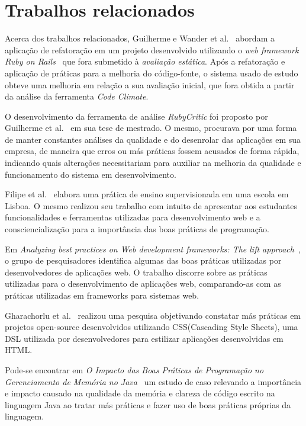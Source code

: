 \documentclass[11pt,a4paper,usenames,dvipsnames]{article}
\begin{document}
\section{Trabalhos relacionados}\label{sec:RelatedWork}

Acerca dos trabalhos relacionados, Guilherme e Wander et al.~\cite{Climate} abordam a aplicação de refatoração em um projeto desenvolvido utilizando o \textit{web framework Ruby on Rails}~\cite{RoR} que fora submetido à \textit{avaliação estática}. Após a refatoração e aplicação de práticas para a melhoria do código-fonte, o sistema usado de estudo obteve uma melhoria em relação a sua avaliação inicial, que fora obtida a partir da análise da ferramenta \textit{Code Climate}\cite{CodeClimate}. 

O desenvolvimento da ferramenta de análise \textit{RubyCritic} foi proposto por Guilherme et al.~\cite{RC} em sua tese de mestrado. O mesmo, procurava por uma forma de manter constantes análises da qualidade e do desenrolar das aplicações em sua empresa, de maneira que erros ou más práticas fossem acusados de forma rápida, indicando quais alterações necessitariam para auxiliar na melhoria da qualidade e funcionamento do sistema em desenvolvimento.

Filipe et al.~\cite{gil2014desenvolvimento} elabora uma prática de ensino supervisionada em uma escola em Lisboa. O mesmo realizou seu trabalho com intuito de apresentar aos estudantes funcionalidades e ferramentas utilizadas para desenvolvimento web e a consciencialização para a importância das boas práticas de programação.

Em \textit{Analyzing best practices on Web development frameworks: The lift approach}~\cite{del2015analyzing}, o grupo de pesquisadores identifica algumas das boas práticas utilizadas por desenvolvedores de aplicações web. O trabalho discorre sobre as práticas utilizadas para o desenvolvimento de aplicações web, comparando-as com as práticas utilizadas em frameworks para sistemas web.

 Gharachorlu et al.~\cite{gharachorlu2014code} realizou uma pesquisa objetivando constatar más práticas em projetos open-source desenvolvidos utilizando CSS(Cascading Style Sheets), uma DSL utilizada por desenvolvedores para estilizar aplicações desenvolvidas em HTML.
 
 Pode-se encontrar em \textit{O Impacto das Boas Práticas de Programação no Gerenciamento de Memória no Java}~\cite{assisimpacto} um estudo de caso relevando a importância e impacto causado na qualidade da memória e clareza de código escrito na linguagem Java ao tratar más práticas e fazer uso de boas práticas próprias da linguagem.
\end{document}

